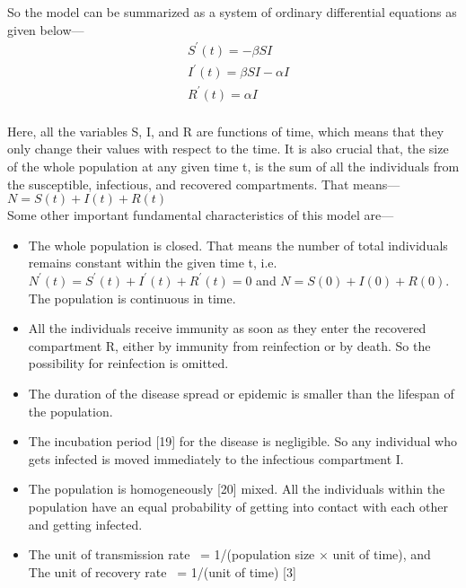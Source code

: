 So the model can be summarized as a system of ordinary differential equations as given below--- \\

\begin{equation}
\begin{aligned}
&S^{\prime}(t)=-\beta SI \\
&I^{\prime}(t)=\beta SI - \alpha I \\
&R^{\prime}(t)=\alpha I \\
\end{aligned}
\end{equation}

Here, all the variables S, I, and R are functions of time, which means that they only change their values with respect to the time. It is also crucial that, the size of the whole population at any given time t, is the sum of all the individuals from the susceptible, infectious, and recovered compartments. That means--- \\

$ N=S (t)+I (t)+R (t) $
\\

Some other important fundamental characteristics of this model are--- \\

\begin{itemize}
	\item The whole population is closed. That means the number of total individuals remains constant within the given time t, i.e. $N^{\prime}(t) = S^{\prime}(t)+I^{\prime} (t)+R^{\prime} (t)= 0$ and $N=S (0)+I (0)+R (0)$. The population is continuous in time. \\
	
	\item All the individuals receive immunity as soon as they enter the recovered compartment R, either by immunity from reinfection or by death. So the possibility for reinfection is omitted. \\
	
	\item The duration of the disease spread or epidemic is smaller than the lifespan of the population. \\
	
	\item The incubation period [19] for the disease is negligible. So any individual who gets infected is moved immediately to the infectious compartment I. \\
	
	\item The population is homogeneously [20] mixed. All the individuals within the population have an equal probability of getting into contact with each other and getting infected. \\
	
	\item The unit of transmission rate \textbeta \ = 1/(population size $\times$ unit of time), and \\
The unit of recovery rate \textalpha \ = 1/(unit of time) [3]

\end{itemize}

